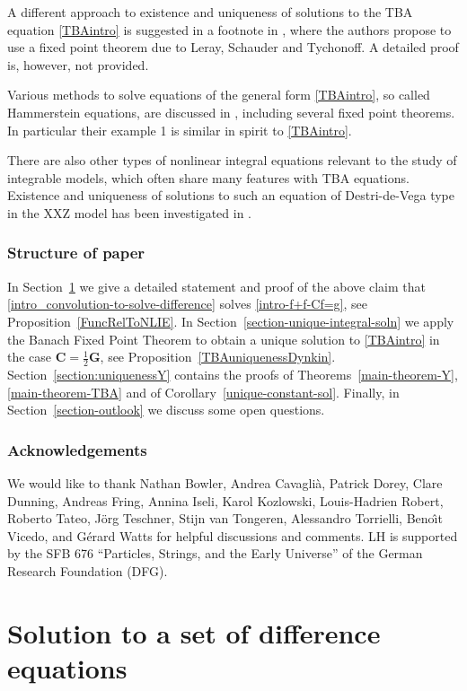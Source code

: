 \documentclass[12pt]{article}
\theoremstyle{plain}
\theoremstyle{definition}
\numberwithin{equation}{section}
\numberwithin{theorem}{section}
\renewcommand{\vec}[1]{\mathbf{#1}}
\begin{document}
A different approach to existence and uniqueness of solutions to the TBA equation \eqref{TBAintro} is suggested in a footnote in \cite[Sec.\,3.2]{KlassenMelzer91}, where the authors propose to use a fixed point theorem due to Leray, Schauder and Tychonoff. A detailed proof is, however, not provided.

Various methods to solve equations of the general form \eqref{TBAintro}, so called Hammerstein equations, are discussed in \cite{AppellChen}, including several fixed point theorems. In particular their example 1 is similar in spirit to \eqref{TBAintro}.


There are also other types of nonlinear integral equations relevant to the study of integrable models, which often share many features with TBA equations.
Existence and uniqueness of solutions to such an  equation of Destri-de-Vega type in the XXZ model has been investigated in \cite{Kozlowski}.


\subsubsection*{Structure of paper}

In Section~\ref{section-soldefeqn} we give a detailed statement and proof of the above claim that \eqref{intro_convolution-to-solve-difference} solves \eqref{intro-f+f-Cf=g}, see Proposition~\ref{FuncRelToNLIE}. In Section~\ref{section-unique-integral-soln} we apply the Banach Fixed Point Theorem to obtain a unique solution to \eqref{TBAintro} in the case $\vec C = \tfrac12 \vec G$, see Proposition~\ref{TBAuniquenessDynkin}. Section~\ref{section:uniquenessY} contains the 
	proofs of Theorems~\ref{main-theorem-Y}, \ref{main-theorem-TBA} and of Corollary~\ref{unique-constant-sol}. 
Finally, in Section~\ref{section-outlook} we discuss some open questions.


\subsubsection*{Acknowledgements}
We would like to thank
	Nathan Bowler,
	Andrea Cavagli\`a,
	Patrick Dorey,
	Clare Dunning,
	Andreas Fring,
	Annina Iseli,
	Karol Kozlowski,
	Louis-Hadrien Robert,
	Roberto Tateo,
	J\"org Teschner,
	Stijn van Tongeren,
	Alessandro Torrielli,
	Beno\^\i t Vicedo,
and
	G\'erard Watts
for helpful discussions and comments.
LH is supported by the 
SFB 676 ``Particles, Strings, and the Early Universe'' of the German Research Foundation (DFG).


\section{Solution to a set of difference equations}
\label{section-soldefeqn}
\end{document}
